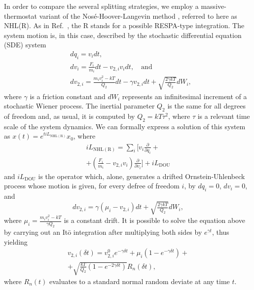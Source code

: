 \documentclass[
    journal=jctcce,
    layout=twocolumn
]{achemso}
\newcommand{\diff}[2]{\frac{\partial #2}{\partial #1}} %
\newcommand{\dof}{i}   %
\newcommand{\Liu}{i\!L}
\begin{document}
In order to compare the several splitting strategies, we employ a massive-thermostat variant of the Nos\'e-Hoover-Langevin method \cite{Samoletov_2007, Leimkuhler_2009}, referred to here as NHL(R).
As in Ref.~, the R stands for a possible RESPA-type integration.
The system motion is, in this case, described by the stochastic differential equation (SDE) system
\begin{subequations}
	\label{eq:NHL equations of motion}
	\begin{align}
	& dq_\dof = v_\dof dt, \label{eq:NHL q} \\
	& dv_\dof = \frac{F_\dof}{m_\dof} dt - v_{2,\dof} v_\dof dt, \quad \mathrm{and} \label{eq:NHL v}  \\
	& dv_{2,\dof} = \tfrac{m_\dof v_\dof^2 - kT}{Q_2}dt - \gamma v_{2,\dof} dt + \sqrt{\tfrac{2 \gamma kT}{Q_2}} dW_\dof, \label{eq:NHL v2}
	\end{align}
\end{subequations}
where $\gamma$ is a friction constant and $dW_\dof$ represents an infinitesimal increment of a stochastic Wiener process.
The inertial parameter $Q_2$ is the same for all degrees of freedom and, as usual, it is computed by $Q_2 = kT\tau^2$, where $\tau$ is a relevant time scale of the system dynamics.
We can formally express a solution of this system as $x(t) = e^{t \Liu_\mathrm{NHL(R)}} x_0$, where
\begin{multline}
\label{eq:NHL Liouville operator}
\Liu_\mathrm{NHL(R)} = \sum_\dof \bigg[ v_\dof \diff{q_\dof}{} + \\
+ \left(\frac{F_\dof}{m_\dof} - v_{2,\dof} v_\dof \right) \diff{v_\dof}{} \bigg] + \Liu_\mathrm{DOU}
\end{multline}
and $\Liu_\mathrm{DOU}$ is the operator which, alone, generates a drifted Ornstein-Uhlenbeck process whose motion is given, for every defree of freedom $\dof$, by $dq_\dof = 0$, $dv_\dof = 0$, and
\begin{equation}
\label{eq:DOU equation of motion}
dv_{2,\dof} = \gamma (\mu_\dof - v_{2,\dof}) dt + \sqrt{\tfrac{2 \gamma kT}{Q_2}} dW_\dof,
\end{equation}
where $\mu_\dof = \frac{m_\dof v_\dof^2 - kT}{\gamma Q_2}$ is a constant drift.
It is possible to solve the equation above by carrying out an It\={o} integration \cite{Leimkuhler_2015} after multiplying both sides by $e^{\gamma t}$, thus yielding
\begin{multline*}
v_{2,\dof}(\delta t) = v_{2,\dof}^0 e^{-\gamma \delta t} +
\mu_\dof (1 - e^{-\gamma \delta t}) + \\
+ \sqrt{\tfrac{kT}{Q_2}(1 - e^{-2\gamma \delta t})} R_n(\delta t),
\end{multline*}
where $R_n(t)$ evaluates to a standard normal random deviate at any time $t$.
\end{document}
